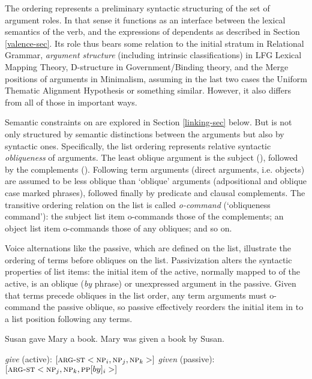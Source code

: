 \documentclass[output=paper]{langsci/langscibook}
\begin{document}
The \argst ordering represents a preliminary syntactic structuring of the set of argument roles.  In that sense it functions as an interface between the lexical semantics of the verb, and the expressions of dependents as described in Section \ref{valence-sec}.  Its role thus bears some relation to the initial stratum in Relational Grammar, \textit{argument structure} (including intrinsic classifications) in LFG Lexical Mapping Theory, D-structure in Government/Binding theory, and the Merge positions of arguments in Minimalism, assuming in the last two cases the Uniform Thematic Alignment Hypothesis \citep{Baker1988} or something similar.  However, it also differs from all of those in important ways.  

Semantic constraints on \argst are explored in Section \ref{linking-sec} below.  But \argst is not only structured by semantic distinctions between the arguments but also  by syntactic  ones.  Specifically, the list ordering represents relative syntactic \textit{obliqueness} of arguments.   The least oblique argument is the subject (\subj), followed by the complements (\comps).  Following \citet{Manning1996} term arguments (direct arguments, i.e. objects) are  assumed to be less oblique than `oblique' arguments (adpositional and oblique case marked phrases), followed finally by predicate and clausal complements.  The transitive ordering relation on the \argst list is called \textit{o-command} (`obliqueness command'): the  subject list item o-commands those of the complements; an object list item o-commands those of any obliques; and so on.
  
Voice alternations like the passive, which are defined on the \argst list, illustrate the ordering of terms before obliques on the \argst list.   Passivization alters the syntactic properties of \argst list items: the initial item of the active, normally mapped to \subj of the active, is an oblique (\textit{by} phrase) or unexpressed argument in the passive.  Given that terms precede obliques in the list order, any term arguments must o-command the passive oblique, so passive effectively reorders the initial item in \argst to a list position following any terms.   

\begin{exe}
\ex \label{passive}
\begin{xlist}
\ex Susan gave Mary a book.
\ex Mary was given a book by Susan.
 \end{xlist}
 \end{exe}

\begin{exe}
\ex \label{pasargst}
\begin{xlist}
\ex \textit{give} (active): $[ \textsc{arg-st}  < \textsc{np}_i, \textsc{np}_j, \textsc{np}_k > ]$
\ex \textit{given} (passive): $[ \textsc{arg-st}  < \textsc{np}_j, \textsc{np}_k, \textsc{pp}[by]_i > ]$
 \end{xlist}
 \end{exe}
\end{document}
